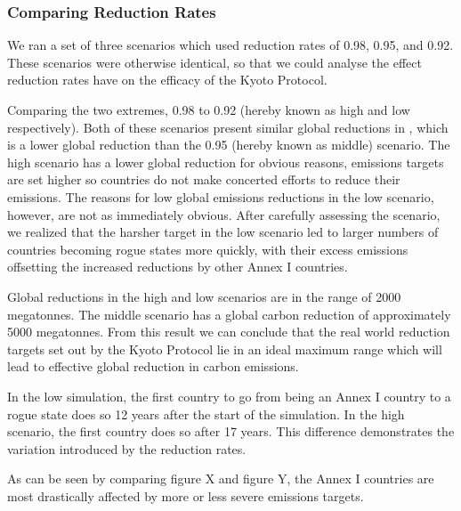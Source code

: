 \subsubsection{Comparing Reduction Rates}

We ran a set of three scenarios which used reduction rates of 0.98, 0.95, and 0.92. These scenarios were otherwise identical, so that we could analyse the effect reduction rates have on the efficacy of the Kyoto Protocol.

Comparing the two extremes, 0.98 to 0.92 (hereby known as high and low respectively). Both of these scenarios present similar global reductions in \CO, which is a lower global reduction than the 0.95 (hereby known as middle) scenario. The high scenario has a lower global reduction for obvious reasons, emissions targets are set higher so countries do not make concerted efforts to reduce their \CO emissions. The reasons for low global emissions reductions in the low scenario, however, are not as immediately obvious. After carefully assessing the scenario, we realized that the harsher target in the low scenario led to larger numbers of countries becoming rogue states more quickly, with their excess emissions offsetting the increased reductions by other Annex I countries.

Global reductions in the high and low scenarios are in the range of 2000 megatonnes. The middle scenario has a global carbon reduction of approximately 5000 megatonnes. From this result we can conclude that the real world reduction targets set out by the Kyoto Protocol lie in an ideal maximum range which will lead to effective global reduction in carbon emissions.

In the low simulation, the first country to go from being an Annex I country to a rogue state does so 12 years after the start of the simulation. In the high scenario, the first country does so after 17 years. This difference demonstrates the variation introduced by the reduction rates.

As can be seen by comparing figure X and figure Y, the Annex I countries are most drastically affected by more or less severe emissions targets.
